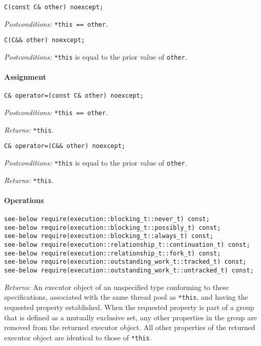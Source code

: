 \documentclass[a4paper,12pt,notitlepage,twoside,openright]{article}
\begin{document}
\begin{verbatim}
C(const C& other) noexcept;
\end{verbatim}

\emph{Postconditions:} \texttt{*this == other}.

\begin{verbatim}
C(C&& other) noexcept;
\end{verbatim}

\emph{Postconditions:} \texttt{*this} is equal to the prior
value of \texttt{other}.

\hypertarget{assignment-2}{%
\paragraph{Assignment}\label{assignment-2}}

\begin{verbatim}
C& operator=(const C& other) noexcept;
\end{verbatim}

\emph{Postconditions:} \texttt{*this == other}.

\emph{Returns:} \texttt{*this}.

\begin{verbatim}
C& operator=(C&& other) noexcept;
\end{verbatim}

\emph{Postconditions:} \texttt{*this} is equal to the prior
value of \texttt{other}.

\emph{Returns:} \texttt{*this}.

\hypertarget{operations-2}{%
\paragraph{Operations}\label{operations-2}}

\begin{verbatim}
see-below require(execution::blocking_t::never_t) const;
see-below require(execution::blocking_t::possibly_t) const;
see-below require(execution::blocking_t::always_t) const;
see-below require(execution::relationship_t::continuation_t) const;
see-below require(execution::relationship_t::fork_t) const;
see-below require(execution::outstanding_work_t::tracked_t) const;
see-below require(execution::outstanding_work_t::untracked_t) const;
\end{verbatim}

\emph{Returns:} An executor object of an unspecified type conforming to
these specifications, associated with the same thread pool as
\texttt{*this}, and having the requested property
established. When the requested property is part of a group that is
defined as a mutually exclusive set, any other properties in the group
are removed from the returned executor object. All other properties of
the returned executor object are identical to those of
\texttt{*this}.
\end{document}
